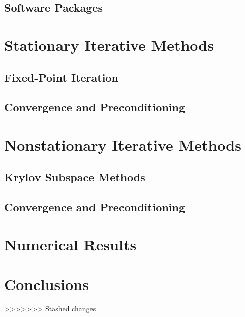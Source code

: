 \documentclass[10pt]{article}
\begin{document}
\begin{multicols}{2}
\subsection{Software Packages}

\section{Stationary Iterative Methods}
\subsection{Fixed-Point Iteration}
\subsection{Convergence and Preconditioning}

\section{Nonstationary Iterative Methods}
\subsection{Krylov Subspace Methods}
\subsection{Convergence and Preconditioning}

\section{Numerical Results}

\section{Conclusions}

\nocite{*}


\end{multicols}
>>>>>>> Stashed changes
\end{document}
